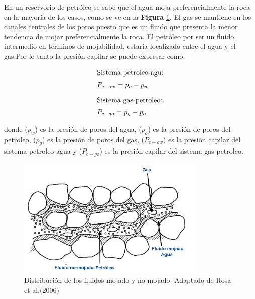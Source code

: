 En un reservorio de petróleo se sabe que el agua moja preferencialmente la roca en la mayoría de los casos, como se ve en la \textbf{Figura} \ref{fig:fig33}. El gas se mantiene en los canales centrales de los poros puesto que es un fluido que presenta la menor tendencia de mojar preferencialmente la roca. El petróleo por ser un fluido intermedio en términos de mojabilidad, estaría localizado entre el agua y el gas.Por lo tanto la presión capilar se puede expresar como:

\begin{ceqn} 
\begin{subequations} \label{eq:equ313} 
\begin{align}
\shortintertext{Sistema petroleo-agu:} &P_{c-ow} = p_o - p_w\label{eq:equ313a} \\[5pt]
\shortintertext{Sistema gas-petroleo:}  &P_{c-go} = p_g - p_o \label{eq:equ313b}
\end{align}
\end{subequations} 
\end{ceqn}

donde ($p_w$) es la presión de poros del agua, ($p_o$) es la presión de poros del petroleo, ($p_g$) es la presión de poros del gas, ($P_{c-ow}$) es la presión capilar del sistema petroleo-agua y ($P_{c-go}$) es la presión capilar del sistema gas-petroleo.\bigskip

\begin{figure}[!ht]
\centering
\includegraphics[width=9cm]{Imagenes/Mojabilidad.png}
\caption[Distribución de los fluidos mojado y no-mojado]{Distribución de los fluidos mojado y no-mojado. Adaptado de Rosa et al.(2006)}
\label{fig:fig33}
\end{figure}


